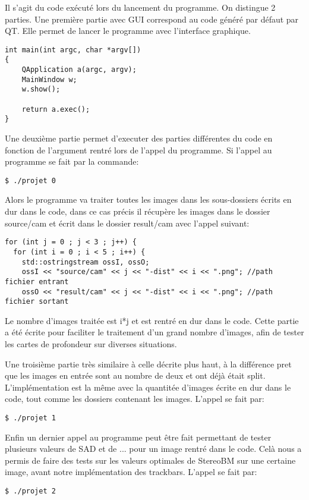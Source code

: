 \documentclass[a4paper]{article}
\begin{document}
Il s'agit du code exécuté lors du lancement du programme. On distingue 2 parties.
Une première partie avec GUI correspond au code généré par défaut par QT.
Elle permet de lancer le programme avec l'interface graphique.

\begin{verbatim}
int main(int argc, char *argv[])
{
	QApplication a(argc, argv);
	MainWindow w;
	w.show();

	return a.exec();
}
\end{verbatim}

Une deuxième partie permet d'executer des parties différentes du code en fonction de l'argument rentré lors de l'appel du programme. Si l'appel au programme se fait par la commande:
\begin{verbatim}
$ ./projet 0
\end{verbatim}
Alors le programme va traiter toutes les images dans les sous-dossiers écrits en dur dans le code, dans ce cas précis il récupère les images dans le dossier source/cam et écrit dans le dossier result/cam avec l'appel suivant:
\begin{verbatim}
for (int j = 0 ; j < 3 ; j++) {
  for (int i = 0 ; i < 5 ; i++) {
    std::ostringstream ossI, ossO;
    ossI << "source/cam" << j << "-dist" << i << ".png"; //path fichier entrant
    ossO << "result/cam" << j << "-dist" << i << ".png"; //path fichier sortant
\end{verbatim}
Le nombre d'images traitée est i*j et est rentré en dur dans le code. Cette partie a été écrite pour faciliter le traitement d'un grand nombre d'images, afin de tester les cartes de profondeur sur diverses situations.

Une troisième partie très similaire à celle décrite plus haut, à la différence pret que les images en entrée sont au nombre de deux et ont déjà était split. L'implémentation est la même avec la quantitée d'images écrite en dur dans le code, tout comme les dossiers contenant les images. L'appel se fait par:
\begin{verbatim}
$ ./projet 1
\end{verbatim}

Enfin un dernier appel au programme peut être fait permettant de tester plusieurs valeurs de SAD  et de ... pour un image rentré dans le code. Celà nous a permis de faire des tests sur les valeurs optimales de StereoBM sur une certaine image, avant notre implémentation des trackbars. L'appel se fait par:
\begin{verbatim}
$ ./projet 2
\end{verbatim}
\end{document}
